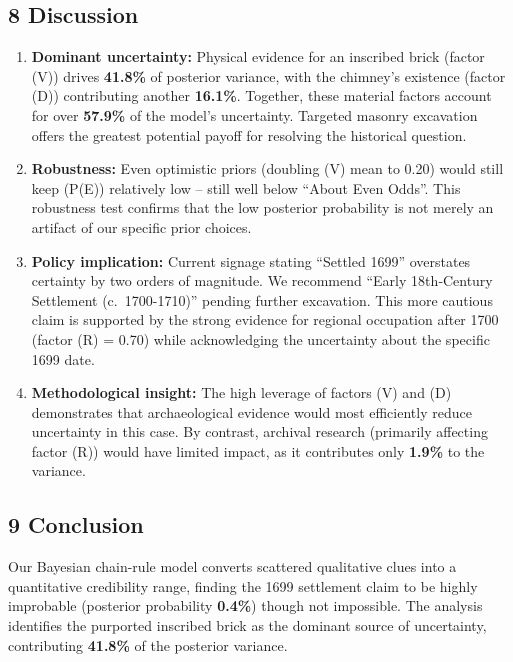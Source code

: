 \documentclass[
  11pt,
]{article}
\begin{document}
\subsection{8 Discussion}\label{discussion}

\begin{enumerate}
\def\labelenumi{\arabic{enumi}.}
\item
  \textbf{Dominant uncertainty:} Physical evidence for an inscribed
  brick (factor (V)) drives \textbf{41.8\%} of posterior variance, with
  the chimney's existence (factor (D)) contributing another
  \textbf{16.1\%}. Together, these material factors account for over
  \textbf{57.9\%} of the model's uncertainty. Targeted masonry
  excavation offers the greatest potential payoff for resolving the
  historical question.
\item
  \textbf{Robustness:} Even optimistic priors (doubling (V) mean to
  0.20) would still keep (P(E)) relatively low -- still well below
  ``About Even Odds''. This robustness test confirms that the low
  posterior probability is not merely an artifact of our specific prior
  choices.
\item
  \textbf{Policy implication:} Current signage stating ``Settled 1699''
  overstates certainty by two orders of magnitude. We recommend ``Early
  18th‑Century Settlement (c.~1700-1710)'' pending further excavation.
  This more cautious claim is supported by the strong evidence for
  regional occupation after 1700 (factor (R) = 0.70) while acknowledging
  the uncertainty about the specific 1699 date.
\item
  \textbf{Methodological insight:} The high leverage of factors (V) and
  (D) demonstrates that archaeological evidence would most efficiently
  reduce uncertainty in this case. By contrast, archival research
  (primarily affecting factor (R)) would have limited impact, as it
  contributes only \textbf{1.9\%} to the variance.
\end{enumerate}

\subsection{9 Conclusion}\label{conclusion}

Our Bayesian chain-rule model converts scattered qualitative clues into
a quantitative credibility range, finding the 1699 settlement claim to
be highly improbable (posterior probability \textbf{0.4\%}) though not
impossible. The analysis identifies the purported inscribed brick as the
dominant source of uncertainty, contributing \textbf{41.8\%} of the
posterior variance.
\end{document}
